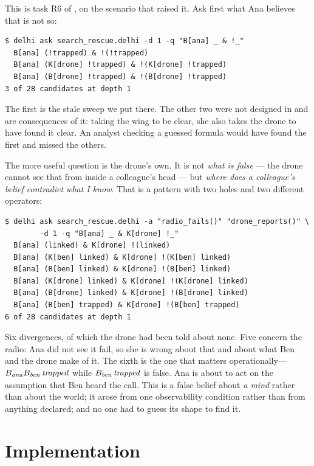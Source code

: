 \documentclass[11pt,a4paper]{article}
\begin{document}
\begin{example}
\label{ex:ask}
This is task R6 of , on the scenario that raised it. Ask first what Ana
believes that is not so:
\begin{lstlisting}[style=shell]
$ delhi ask search_rescue.delhi -d 1 -q "B[ana] _ & !_"
  B[ana] (!trapped) & !(!trapped)
  B[ana] (K[drone] !trapped) & !(K[drone] !trapped)
  B[ana] (B[drone] !trapped) & !(B[drone] !trapped)
3 of 28 candidates at depth 1
\end{lstlisting}
The first is the stale sweep we put there. The other two were not designed in and are
consequences of it: taking the wing to be clear, she also takes the drone to have found it
clear. An analyst checking a guessed formula would have found the first and missed the others.

The more useful question is the drone's own. It is not \emph{what is false} --- the drone cannot
see that from inside a colleague's head --- but \emph{where does a colleague's belief contradict
what I know}. That is a pattern with two holes and two different operators:
\begin{lstlisting}[style=shell]
$ delhi ask search_rescue.delhi -a "radio_fails()" "drone_reports()" \
        -d 1 -q "B[ana] _ & K[drone] !_"
  B[ana] (linked) & K[drone] !(linked)
  B[ana] (K[ben] linked) & K[drone] !(K[ben] linked)
  B[ana] (B[ben] linked) & K[drone] !(B[ben] linked)
  B[ana] (K[drone] linked) & K[drone] !(K[drone] linked)
  B[ana] (B[drone] linked) & K[drone] !(B[drone] linked)
  B[ana] (B[ben] trapped) & K[drone] !(B[ben] trapped)
6 of 28 candidates at depth 1
\end{lstlisting}
Six divergences, of which the drone had been told about none. Five concern the radio: Ana did
not see it fail, so she is wrong about that and about what Ben and the drone make of it. The
sixth is the one that matters operationally---%
$B_{\mathit{ana}}B_{\mathit{ben}}\,\mathit{trapped}$ while
$B_{\mathit{ben}}\,\mathit{trapped}$ is false. Ana is about to act on the assumption that Ben
heard the call. This is a false belief about \emph{a mind} rather than about the world; it arose
from one observability condition rather than from anything declared; and no one had to guess its
shape to find it.
\end{example}

\section{Implementation}
\label{sec:impl}
\end{document}
